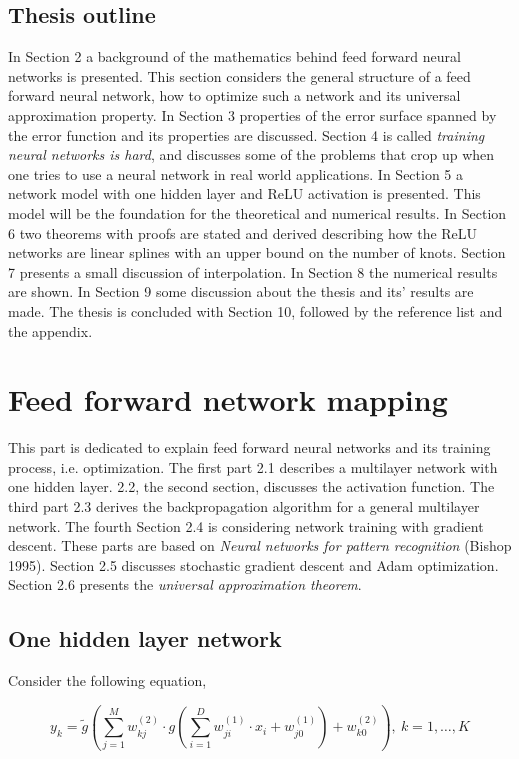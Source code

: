\documentclass[11pt, letterpaper]{amsart}
\begin{document}
\subsection{Thesis outline}
In Section 2 a background of the mathematics behind feed forward neural networks is presented. This section considers the general structure of a feed forward neural network, how to optimize such a network and its universal approximation property. In Section 3 properties of the error surface spanned by the error function and its properties are discussed. Section 4 is called \textit{training neural networks is hard}, and discusses some of the problems that crop up when one tries to use a neural network in real world applications. In Section 5 a network model with one hidden layer and ReLU activation is presented. This model will be the foundation for the theoretical and numerical results. In Section 6 two theorems with proofs are stated and derived describing how the ReLU networks are linear splines with an upper bound on the number of knots. Section 7 presents a small discussion of interpolation. In Section 8 the numerical results are shown. In Section 9 some discussion about the thesis and its' results are made. The thesis is concluded with Section 10, followed by the reference list and the appendix.

\section{Feed forward network mapping}
This part is dedicated to explain feed forward neural networks and its training process, i.e. optimization. The first part 2.1 describes a multilayer network with one hidden layer. 2.2, the second section, discusses the activation function. The third part 2.3 derives the backpropagation algorithm for a general multilayer network. The fourth Section 2.4 is considering network training with gradient descent. These parts are based on \textit{Neural networks for pattern recognition} (Bishop 1995). Section 2.5 discusses stochastic gradient descent and Adam optimization. Section 2.6 presents the \textit{universal approximation theorem}.

\subsection{One hidden layer network}
Consider the following equation,

\begin{equation}
    y_k = \widetilde{g} \left( \sum_{j=1}^M w_{kj}^{(2)} \cdot g \left( \sum_{i=1}^D w_{ji}^{(1)} \cdot x_i + w_{j0}^{(1)}\right) + w_{k0}^{(2)} \right), \ k = 1,\ldots,K
\end{equation}
\end{document}
